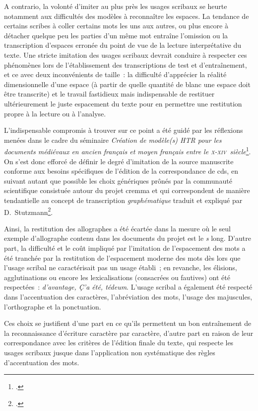\documentclass[a4paper,12pt,twoside]{book}
\newcommand{\siecle}[1]{\textsc{#1}\ieme}
\begin{document}
				A contrario, la volonté d'imiter au plus près les usages scribaux se heurte notamment aux difficultés des modèles à reconnaître les espaces. La tendance de certains scribes à coller certains mots les uns aux autres, ou plus encore à détacher quelque peu les parties d'un même mot entraîne l'omission ou la transcription d'espaces erronée du point de vue de la lecture interprétative du texte. Une stricte imitation des usages scribaux devrait conduire à respecter ces phénomènes lors de l'établissement des transcriptions de test et d'entraînement, et ce avec deux inconvénients de taille~: la difficulté d'apprécier la réalité dimensionnelle d'une espace (à partir de quelle quantité de blanc une espace doit être transcrite) et le travail fastidieux mais indispensable de restituer ultérieurement le juste espacement du texte pour en permettre une restitution propre à la lecture ou à l'analyse.
				
				L'indispensable compromis à trouver sur ce point a été guidé par les réflexions menées dans le cadre du séminaire \textit{Création de modèle(s) HTR pour les documents médiévaux en ancien français et moyen français entre le \siecle{x}-\siecle{xiv}~siècle}\footcite{pincheSeminaireCreationModele2021b}. On s'est donc efforcé de définir le degré d'imitation de la source manuscrite conforme aux besoins spécifiques de l'édition de la correspondance de \gls{cds}, en suivant autant que possible les choix génériques prônés par la communauté scientifique consistuée autour du projet \gls{cremma} et qui correspondent de manière tendantielle au concept de transcription \textit{graphématique} traduit et expliqué par D.~Stutzmann\footcite[p.~251]{stutzmannPaleographieStatistiquePour2011a}.
				
				Ainsi, la restitution des allographes a été écartée dans la mesure où le seul exemple d'allographe contenu dans les documents du projet est le \textit{s} long. D'autre part, la difficulté et le coût impliqué par l'imitation de l'espacement des mots a été tranchée par la restitution de l'espacement moderne des mots dès lors que l'usage scribal ne caractérisait pas un usage établi~; en revanche, les élisions, agglutinations ou encore les lexicalisations (consacrées ou fautives) ont été respectées~: \textit{d'avantage, Ç'a été, tédeum}. L'usage scribal a également été respecté dans l'accentuation des caractères, l'abréviation des mots, l'usage des majuscules, l'orthographe et la ponctuation.
				
				Ces choix se justifient d'une part en ce qu'ils permettent un bon entraînement de la reconnaissance d'écriture caractère par caractère, d'autre part en raison de leur correspondance avec les critères de l'édition finale du texte, qui respecte les usages scribaux jusque dans l'application non systématique des règles d'accentuation des mots.
				
\end{document}
